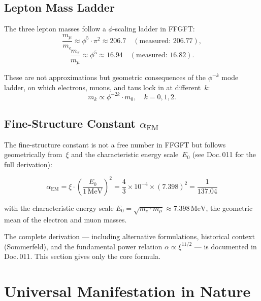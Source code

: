 \subsection{Lepton Mass Ladder}

The three lepton masses follow a $\phi$-scaling ladder in FFGFT:
\begin{equation}
  \frac{m_\mu}{m_e} \approx \phi^5 \cdot \pi^2 \approx 206.7
  \quad (\text{measured: } 206.77),
\end{equation}
\begin{equation}
  \frac{m_\tau}{m_\mu} \approx \phi^5
  \approx 16.94
  \quad (\text{measured: } 16.82).
\end{equation}

These are not approximations but geometric consequences of the
$\phi^{-k}$ mode ladder, on which electrons, muons, and taus lock
in at different~$k$:
\begin{equation}
  m_k \propto \phi^{-2k} \cdot m_0, \quad k = 0, 1, 2.
\end{equation}

\subsection{Fine-Structure Constant $\alpha_\text{EM}$}

The fine-structure constant is not a free number in FFGFT but follows
geometrically from~$\xi$ and the characteristic energy scale~$E_0$
(see Doc.\,011 for the full derivation):

\begin{equation}
  \alpha_\text{EM} = \xi \cdot \left(\frac{E_0}{1\,\text{MeV}}\right)^2
  = \frac{4}{3} \times 10^{-4} \times (7.398)^2
  = \frac{1}{137.04}
\end{equation}

\noindent with the characteristic energy scale
$E_0 = \sqrt{m_e \cdot m_\mu} \approx 7.398\,\text{MeV}$,
the geometric mean of the electron and muon masses.

\begin{warnbox}
The complete derivation — including alternative formulations,
historical context (Sommerfeld), and the fundamental power relation
$\alpha \propto \xi^{11/2}$ — is documented in Doc.\,011.
This section gives only the core formula.
\end{warnbox}

\section{Universal Manifestation in Nature}

